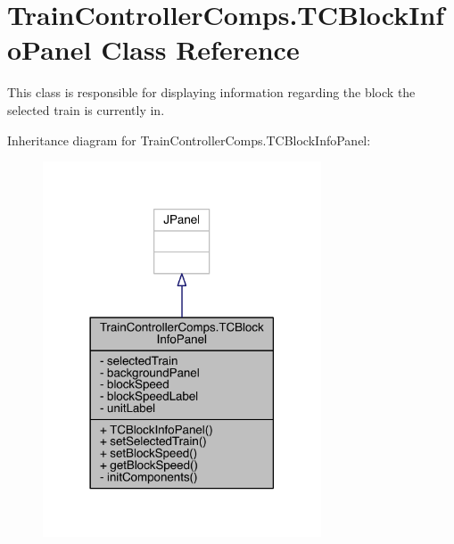 \hypertarget{classTrainControllerComps_1_1TCBlockInfoPanel}{}\section{Train\+Controller\+Comps.\+T\+C\+Block\+Info\+Panel Class Reference}
\label{classTrainControllerComps_1_1TCBlockInfoPanel}


This class is responsible for displaying information regarding the block the selected train is currently in.  




Inheritance diagram for Train\+Controller\+Comps.\+T\+C\+Block\+Info\+Panel\+:
\nopagebreak
\begin{figure}[H]
\begin{center}
\leavevmode
\includegraphics[width=234pt]{classTrainControllerComps_1_1TCBlockInfoPanel__inherit__graph}
\end{center}
\end{figure}


